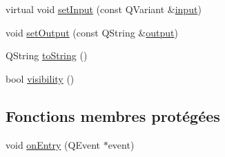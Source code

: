 \begin{DoxyCompactItemize}
\item 
virtual void \hyperlink{classSH__QuestionState_ab40b6202090d1afcc965e124b2deb88a}{set\-Input} (const Q\-Variant \&\hyperlink{classSH__InOutState_a8e1b78069343122df7713624a1a5a100}{input})
\item 
void \hyperlink{classSH__DatabaseContentQuestionState_aaec6c7f8bc78c6beb7447fc41ffe3875}{set\-Output} (const Q\-String \&\hyperlink{classSH__InOutState_a17ed7eaf5e3ed5af80a4f9fe65d5bfd9}{output})
\item 
Q\-String \hyperlink{classSH__GenericState_a7779babbb40f3f8faa71112204d9804f}{to\-String} ()
\item 
bool \hyperlink{classSH__InOutState_a3a18752c4122c26a2ebf38310c9c1b75}{visibility} ()
\end{DoxyCompactItemize}
\subsection*{Fonctions membres protégées}
\begin{DoxyCompactItemize}
\item 
void \hyperlink{classSH__GenericState_a68c67ef95738e01cd34cd5926f4932fb}{on\-Entry} (Q\-Event $\ast$event)
\end{DoxyCompactItemize}
